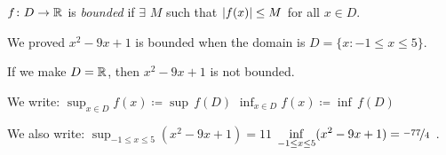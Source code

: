 \documentclass[10pt,aspectratio=149]{beamer}
\begin{document}
\begin{frame}

\begin{definition}
$f \colon D \to {\mathbb{R}}$ is
\emph{bounded}
if $\exists$ $M$
such that $\left\lvert {f(x)} \right\rvert \leq M$ for all $x \in D$.
\end{definition}

\pause

We proved $x^2-9x+1$ is bounded when the domain is $D = \{ x : -1 \leq x \leq 5 \}$.


\medskip
\pause

If we make $D={\mathbb{R}}$, then $x^2-9x+1$ is not bounded.

\medskip
\pause

We write: \quad 
$\displaystyle \sup_{x \in D} f(x) \coloneqq \sup\, f(D)$
\quad
$\displaystyle \inf_{x \in D} f(x) \coloneqq \inf\, f(D)$

\medskip
\pause

We also write: \quad 
$\displaystyle
\sup_{-1 \leq x \leq 5} ( x^2 -9x+1 ) = 11$
\quad
$\displaystyle\inf_{-1 \leq x \leq 5} ( x^2 -9x+1 ) = \nicefrac{-77}{4}$ .

\medskip
\pause

\begin{center}
\end{center}

\end{frame}
\end{document}
